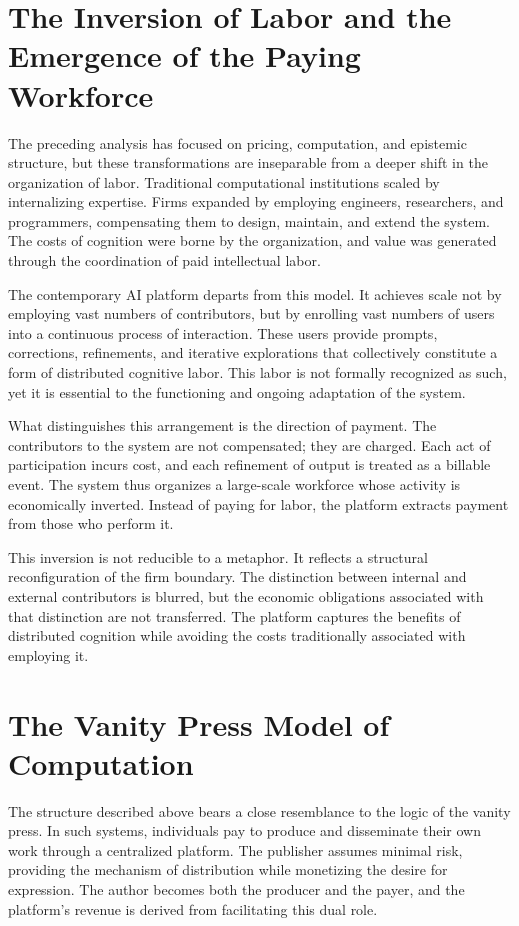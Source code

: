 \documentclass[12pt, oneside]{article}
\begin{document}
\section{The Inversion of Labor and the Emergence of the Paying Workforce}

The preceding analysis has focused on pricing, computation, and epistemic structure, but these transformations are inseparable from a deeper shift in the organization of labor. Traditional computational institutions scaled by internalizing expertise. Firms expanded by employing engineers, researchers, and programmers, compensating them to design, maintain, and extend the system. The costs of cognition were borne by the organization, and value was generated through the coordination of paid intellectual labor.

The contemporary AI platform departs from this model. It achieves scale not by employing vast numbers of contributors, but by enrolling vast numbers of users into a continuous process of interaction. These users provide prompts, corrections, refinements, and iterative explorations that collectively constitute a form of distributed cognitive labor. This labor is not formally recognized as such, yet it is essential to the functioning and ongoing adaptation of the system.

What distinguishes this arrangement is the direction of payment. The contributors to the system are not compensated; they are charged. Each act of participation incurs cost, and each refinement of output is treated as a billable event. The system thus organizes a large-scale workforce whose activity is economically inverted. Instead of paying for labor, the platform extracts payment from those who perform it.

This inversion is not reducible to a metaphor. It reflects a structural reconfiguration of the firm boundary. The distinction between internal and external contributors is blurred, but the economic obligations associated with that distinction are not transferred. The platform captures the benefits of distributed cognition while avoiding the costs traditionally associated with employing it.

\section{The Vanity Press Model of Computation}

The structure described above bears a close resemblance to the logic of the vanity press. In such systems, individuals pay to produce and disseminate their own work through a centralized platform. The publisher assumes minimal risk, providing the mechanism of distribution while monetizing the desire for expression. The author becomes both the producer and the payer, and the platform’s revenue is derived from facilitating this dual role.
\end{document}
